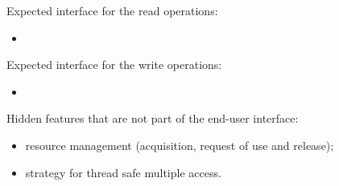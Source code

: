 	Expected interface for the read operations:
	\begin{itemize}
		\item 
	\end{itemize}

	Expected interface for the write operations:
	\begin{itemize}
		\item 
	\end{itemize}

	Hidden features that are not part of the end-user interface:
	\begin{itemize}
		\item resource management (acquisition, request of use and release);
		\item strategy for thread safe multiple access.
	\end{itemize}
	